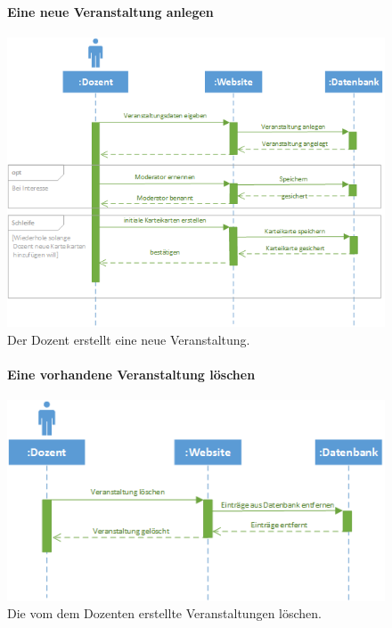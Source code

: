 \documentclass[12pt,a4paper]{article}
\begin{document}
\begin{figure}[H]
	\centering
	\paragraph{Eine neue Veranstaltung anlegen}
	\includegraphics[width=\textwidth]{Bilder/Sequenzdiagramme/VeranstaltungAnlegen.png}
	\caption{Der Dozent erstellt eine neue Veranstaltung.}
	\label{SzVeranstaltungAnlegen}
\end{figure}
\begin{figure}[H]
	\centering
	\paragraph{Eine vorhandene Veranstaltung löschen}
	\includegraphics[width=\textwidth]{Bilder/Sequenzdiagramme/VeranstaltungLoeschen.png}
	\caption{Die vom dem Dozenten erstellte Veranstaltungen löschen.}
	\label{SzVeranstaltungLoeschen}
\end{figure}
\end{document}
